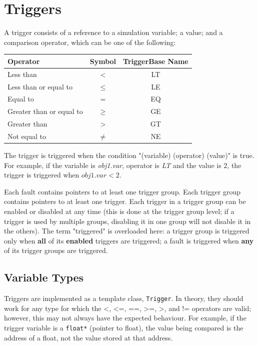 \documentclass[11pt,fleqn]{report}
\begin{document}
\section{Triggers} \label{intro_trigger}
\par A trigger consists of a reference to a simulation variable; a value; and a
comparison operator, which can be one of the following:
\begin{center}\begin{tabular}{|l|c|c|} \hline
\textbf{Operator} & \textbf{Symbol} & \textbf{TriggerBase Name} \\ \hline
Less than                & <      & LT \\ \hline
Less than or equal to    & $\leq$ & LE \\ \hline
Equal to                 & =      & EQ \\ \hline
Greater than or equal to & $\geq$ & GE \\ \hline
Greater than             & >      & GT \\ \hline
Not equal to             & $\neq$ & NE \\ \hline
\end{tabular}\end{center}
The trigger is triggered when the condition "(variable) (operator) (value)" is
true.
For example, if the variable is \textit{obj1.var}, operator is \textit{LT} and
the value is $2$, the trigger is triggered
when $obj1.var < 2$.

\par Each fault contains pointers to at least one trigger group.
Each trigger group contains pointers to at least one trigger.
Each trigger in a trigger group can be enabled or disabled at any time (this is
done at the trigger group level; if a trigger is used by multiple groups,
disabling it in one group will not disable it in the others).
The term "triggered" is overloaded here: a trigger group is triggered only
when \textbf{all} of its \textbf{enabled} triggers are triggered; a fault is
triggered when \textbf{any} of its trigger groups are triggered.

\subsection{Variable Types}
\par Triggers are implemented as a template class, \verb"Trigger".
In theory, they should work for any type for which the <, <=, ==, >=, >, and !=
operators are valid; however, this may not always have the expected behaviour.
For example, if the trigger variable is a \verb"float*" (pointer to float), the
value being compared is the address of a float, not the value stored at that
address.
\end{document}
